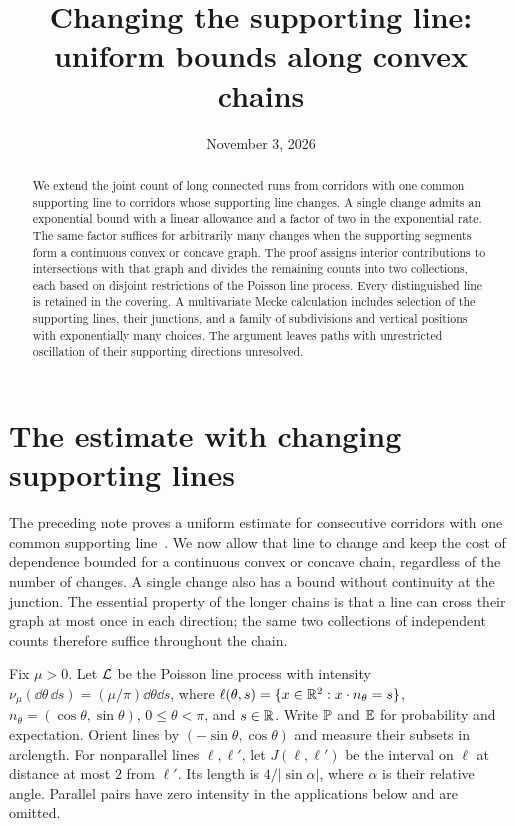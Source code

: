 \documentclass[11pt,letterpaper]{article}
\title{Changing the supporting line:\\uniform bounds along convex chains}
\author{}
\date{November 3, 2026}
\begin{document}
\maketitle
\begin{abstract}
We extend the joint count of long connected runs from corridors with one common supporting line to corridors whose supporting line changes. A single change admits an exponential bound with a linear allowance and a factor of two in the exponential rate. The same factor suffices for arbitrarily many changes when the supporting segments form a continuous convex or concave graph. The proof assigns interior contributions to intersections with that graph and divides the remaining counts into two collections, each based on disjoint restrictions of the Poisson line process. Every distinguished line is retained in the covering. A multivariate Mecke calculation includes selection of the supporting lines, their junctions, and a family of subdivisions and vertical positions with exponentially many choices. The argument leaves paths with unrestricted oscillation of their supporting directions unresolved.
\end{abstract}

\section{The estimate with changing supporting lines}

The preceding note proves a uniform estimate for consecutive corridors with one common supporting line~\cite{ORC26}. We now allow that line to change and keep the cost of dependence bounded for a continuous convex or concave chain, regardless of the number of changes. A single change also has a bound without continuity at the junction. The essential property of the longer chains is that a line can cross their graph at most once in each direction; the same two collections of independent counts therefore suffice throughout the chain.

Fix $\mu>0$. Let $\cL$ be the Poisson line process with intensity $\nu_\mu(\dd\theta\,\dd s)=(\mu/\pi)\dd\theta\dd s$, where $\ell(\theta,s)=\{x\in\R^2:x\cdot n_\theta=s\}$, $n_\theta=(\cos\theta,\sin\theta)$, $0\le\theta<\pi$, and $s\in\R$. Write $\P$ and $\E$ for probability and expectation. Orient lines by $(-\sin\theta,\cos\theta)$ and measure their subsets in arclength. For nonparallel lines $\ell,\ell'$, let $J(\ell,\ell')$ be the interval on $\ell$ at distance at most $2$ from $\ell'$. Its length is $4/|\sin\alpha|$, where $\alpha$ is their relative angle. Parallel pairs have zero intensity in the applications below and are omitted.
\end{document}
